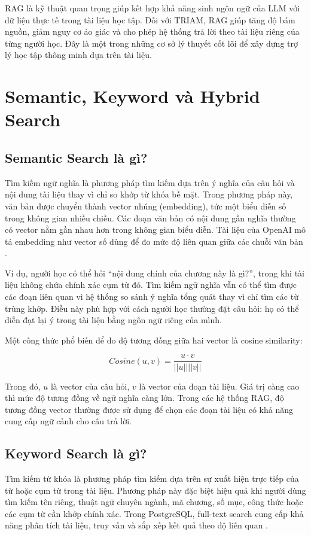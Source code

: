 \documentclass[12pt,a4paper]{report}
\begin{document}
RAG là kỹ thuật quan trọng giúp kết hợp khả năng sinh ngôn ngữ của LLM với dữ liệu thực tế trong tài liệu học tập. Đối với TRIAM, RAG giúp tăng độ bám nguồn, giảm nguy cơ ảo giác và cho phép hệ thống trả lời theo tài liệu riêng của từng người học. Đây là một trong những cơ sở lý thuyết cốt lõi để xây dựng trợ lý học tập thông minh dựa trên tài liệu.

\section{Semantic, Keyword và Hybrid Search}

\subsection{Semantic Search là gì?}

Tìm kiếm ngữ nghĩa là phương pháp tìm kiếm dựa trên ý nghĩa của câu hỏi và nội dung tài liệu thay vì chỉ so khớp từ khóa bề mặt. Trong phương pháp này, văn bản được chuyển thành vector nhúng (embedding), tức một biểu diễn số trong không gian nhiều chiều. Các đoạn văn bản có nội dung gần nghĩa thường có vector nằm gần nhau hơn trong không gian biểu diễn. Tài liệu của OpenAI mô tả embedding như vector số dùng để đo mức độ liên quan giữa các chuỗi văn bản \cite{openaiEmbeddingsDocs}.

Ví dụ, người học có thể hỏi ``nội dung chính của chương này là gì?'', trong khi tài liệu không chứa chính xác cụm từ đó. Tìm kiếm ngữ nghĩa vẫn có thể tìm được các đoạn liên quan vì hệ thống so sánh ý nghĩa tổng quát thay vì chỉ tìm các từ trùng khớp. Điều này phù hợp với cách người học thường đặt câu hỏi: họ có thể diễn đạt lại ý trong tài liệu bằng ngôn ngữ riêng của mình.

Một công thức phổ biến để đo độ tương đồng giữa hai vector là cosine similarity:

\[
Cosine(u, v) = \frac{u \cdot v}{||u|| ||v||}
\]

Trong đó, \(u\) là vector của câu hỏi, \(v\) là vector của đoạn tài liệu. Giá trị càng cao thì mức độ tương đồng về ngữ nghĩa càng lớn. Trong các hệ thống RAG, độ tương đồng vector thường được sử dụng để chọn các đoạn tài liệu có khả năng cung cấp ngữ cảnh cho câu trả lời.

\subsection{Keyword Search là gì?}

Tìm kiếm từ khóa là phương pháp tìm kiếm dựa trên sự xuất hiện trực tiếp của từ hoặc cụm từ trong tài liệu. Phương pháp này đặc biệt hiệu quả khi người dùng tìm kiếm tên riêng, thuật ngữ chuyên ngành, mã chương, số mục, công thức hoặc các cụm từ cần khớp chính xác. Trong PostgreSQL, full-text search cung cấp khả năng phân tích tài liệu, truy vấn và sắp xếp kết quả theo độ liên quan \cite{postgresTextSearchDocs}.
\end{document}
